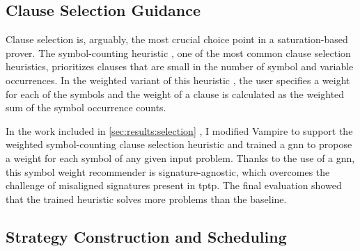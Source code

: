 \subsection{Clause Selection Guidance}
\label{sec:contrib:ClauseSelection}


Clause selection is, arguably, the most crucial choice point in a saturation-based prover.
The symbol-counting heuristic \cite{DBLP:conf/cade/SchulzM16}, one of the most common clause selection heuristics,
prioritizes clauses that are small in the number of symbol and variable occurrences.
In the weighted variant of this heuristic \cite{E-manual},
the user specifies a weight for each of the symbols
and
the weight of a clause is calculated as the weighted sum of the symbol occurrence counts.

In the work included in \cref{sec:results:selection} \cite{DBLP:conf/lpar/Bartek023},
I modified Vampire to support the weighted symbol-counting clause selection heuristic
and trained a \gls{gnn} to propose a weight for each symbol of any given input problem.
Thanks to the use of a \gls{gnn}, this symbol weight recommender is signature-agnostic,
which overcomes the challenge of misaligned signatures present in \gls{tptp}.
The final evaluation showed that
the trained heuristic solves  more problems than the baseline.


\subsection{Strategy Construction and Scheduling}
\label{sec:contrib:schedules}

